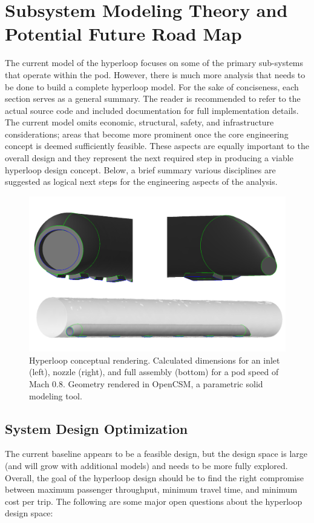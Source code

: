 \documentclass[heading.tex]{subfiles}
\begin{document}
\newpage
\appendix

\section{Subsystem Modeling Theory and Potential Future Road Map} \label{app:future}

The current model of the hyperloop focuses on some of the primary sub-systems that operate within the pod. However, there is much more
analysis that needs to be done to build a complete hyperloop model.
For the sake of conciseness, each section serves as a general summary. The reader is recommended to refer to the actual source code and
included documentation for full implementation details. The current model omits economic, structural, safety, and infrastructure
considerations; areas that become more prominent once the core engineering concept is deemed sufficiently feasible. These aspects are
equally important to the overall design and they represent the next required step in producing a viable hyperloop design concept.
Below, a brief summary various disciplines are suggested as logical next steps for the engineering aspects of the analysis.

\begin{figure}[hbtp]
\centering
\includegraphics[width=\textwidth]{images/hyperloop_cad.png}
 \caption[Hyperloop geometry assembled in OpenCSM]{Hyperloop conceptual rendering. Calculated dimensions for an inlet (left), nozzle (right), and full assembly (bottom) for a pod speed of Mach 0.8. Geometry rendered in OpenCSM, a parametric solid modeling tool.}
\label{f:hyperloopCAD}
\end{figure}

\subsection{System Design Optimization}
The current baseline appears to be a feasible design, but the design space is large (and will grow with additional models) and needs to be
more fully explored. Overall, the goal of the hyperloop design should be to find the right compromise between maximum passenger
throughput, minimum travel time, and minimum cost per trip. The following are some major open questions about the hyperloop design
space:
\end{document}
